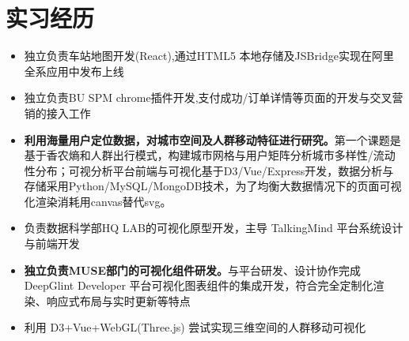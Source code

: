 \documentclass{resume}
\begin{document}

\section{实习经历}
\begin{itemize}
  \item 独立负责车站地图开发(React),通过HTML5 本地存储及JSBridge实现在阿里全系应用中发布上线
  \item 独立负责BU SPM chrome插件开发,支付成功/订单详情等页面的开发与交叉营销的接入工作
\end{itemize}

\begin{itemize}
  \item \textbf{利用海量用户定位数据，对城市空间及人群移动特征进行研究。}第一个课题是基于香农熵和人群出行模式，构建城市网格与用户矩阵分析城市多样性/流动性分布；可视分析平台前端与可视化基于D3/Vue/Express开发，数据分析与存储采用Python/MySQL/MongoDB技术，为了均衡大数据情况下的页面可视化渲染消耗用canvas替代svg。
  \item 负责数据科学部HQ LAB的可视化原型开发，主导 TalkingMind 平台系统设计与前端开发
\end{itemize}

\begin{itemize}
  \item \textbf{独立负责MUSE部门的可视化组件研发。}与平台研发、设计协作完成 DeepGlint Developer 平台可视化图表组件的集成开发，符合完全定制化渲染、响应式布局与实时更新等特点
  \item 利用 D3+Vue+WebGL(Three.js) 尝试实现三维空间的人群移动可视化
\end{itemize}


\end{document}
